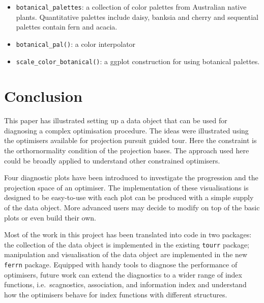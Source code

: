 \documentclass[12pt]{article}
\providecommand{\tightlist}{%
  \setlength{\itemsep}{0pt}\setlength{\parskip}{0pt}}
\begin{document}
\begin{itemize}
  \begin{itemize}
  \tightlist
  \item
    \texttt{botanical\_palettes}: a collection of color palettes from Australian native plants. Quantitative palettes include daisy, banksia and cherry and sequential palettes contain fern and acacia.
  \item
    \texttt{botanical\_pal()}: a color interpolator
  \item
    \texttt{scale\_color\_botanical()}: a ggplot construction for using botanical palettes.
  \end{itemize}
\end{itemize}

\hypertarget{conclusion}{%
\section{Conclusion}\label{conclusion}}

This paper has illustrated setting up a data object that can be used for diagnosing a complex optimisation procedure. The ideas were illustrated using the optimisers available for projection pursuit guided tour. Here the constraint is the orthornormality condition of the projection bases. The approach used here could be broadly applied to understand other constrained optimisers.

Four diagnostic plots have been introduced to investigate the progression and the projection space of an optimiser. The implementation of these visualisations is designed to be easy-to-use with each plot can be produced with a simple supply of the data object. More advanced users may decide to modify on top of the basic plots or even build their own.

Most of the work in this project has been translated into code in two packages: the collection of the data object is implemented in the existing \texttt{tourr} package; manipulation and visualisation of the data object are implemented in the new \texttt{ferrn} package. Equipped with handy tools to diagnose the performance of optimisers, future work can extend the diagnostics to a wider range of index functions, i.e.~scagnostics, association, and information index \citep{laa2020using} and understand how the optimisers behave for index functions with different structures.

\clearpage



\end{document}
